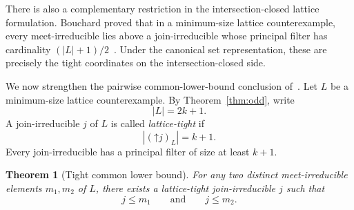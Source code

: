 \documentclass[11pt]{amsart}
\newtheorem{theorem}{Theorem}[section]
\theoremstyle{definition}
\theoremstyle{remark}
\begin{document}
There is also a complementary restriction in the intersection-closed lattice formulation. Bouchard proved that in a minimum-size lattice counterexample, every meet-irreducible lies above a join-irreducible whose principal filter has cardinality $(|L|+1)/2$~\cite[Theorem~2.12]{Bouchard2025}. Under the canonical set representation, these are precisely the tight coordinates on the intersection-closed side.

We now strengthen the pairwise common-lower-bound conclusion of~\cite[Corollary~2.11]{Bouchard2025}. Let $L$ be a minimum-size lattice counterexample. By Theorem~\ref{thm:odd}, write
\[
  |L|=2k+1.
\]
A join-irreducible $j$ of $L$ is called \emph{lattice-tight} if
\[
  |(\mathord\uparrow j)_L|=k+1.
\]
Every join-irreducible has a principal filter of size at least $k+1$.

\begin{theorem}[Tight common lower bound]\label{thm:tight-common}
For any two distinct meet-irreducible elements $m_1,m_2$ of $L$, there exists a lattice-tight join-irreducible $j$ such that
\[
  j\le m_1\qquad\text{and}\qquad j\le m_2.
\]
\end{theorem}
\end{document}
